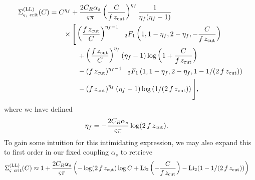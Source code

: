 \begin{example}
    \begin{equation}
    \begin{aligned}
        \Sigma^{\rm(LL)}_{\varsigma,~{\rm crit}} (C)
        &=
        C^{\eta_f}
        + \frac{2C_R\alpha_s}
        {\varsigma \pi}
        \left(
            \frac{C}{f\,\zcut}
        \right)
        ^{\eta_f}
        \frac{1}{\eta_f(\eta_f-1)}
        \\
        &~~~~~~
        \times
        \Bigg[
            \left(
            \frac{f\,\zcut}{C}
            \right)
            ^{\eta_f - 1}
            {}_{~~2}F_1
            \left(
                1, 1-\eta_f, 2-\eta_f,
                -\frac{C}{f\,\zcut}
            \right)
            \\
            &~~~~~~~~~~~~
            +
            \left(
            \frac{f\,\zcut}{C}
            \right)
            ^{\eta_f}
            \left(\eta_f-1\right)
            \log\left(
            1 + \frac{C} {f\,\zcut}
            \right)
            \\
            &~~~~~~~~~~~~
            -\left(f\,\zcut\right)
            ^{\eta_f - 1}
            {}_{~~2}F_1
            \left(
                1,1-\eta_f,2-\eta_f,
                1-1/(2\,f\,\zcut)
            \right)
            \\
            &~~~~~~~~~~~~
            -
            \left(f\,\zcut\right)
            ^{\eta_f}
            \left(\eta_f-1\right)
            \log\left(1/(2\,f\,\zcut)\right)
        \Bigg]
        ,
        \label{eq:ECF_LL}
    \end{aligned}
    \end{equation}
    where we have defined
    \begin{align}
        \eta_f
        &=
        -\frac{2 C_R \alpha_s}{\varsigma \pi}
        \log(2\,f\,z_{\rm cut})
        .
    \end{align}
    To gain some intuition for this intimidating expression, we may also expand this to first order in our fixed coupling \(\alpha_s\) to retrieve
    \begin{equation}
    \begin{aligned}
        \Sigma^{\rm(LL)}_{\varsigma~{\rm crit}} (C)
        &\approx
        1 + \frac{2 C_R \alpha_s} {\varsigma \pi}
        \left(
            -\log(2\,f\,\zcut)
            \log C
            +
            {\rm Li}_2
            \left(
            -\frac{C}{f\,\zcut}
            \right)
            -
            {\rm Li}_2(1 - 1/(2\,f\,\zcut))
        \right)

\end{aligned}
\end{equation}
\end{example}
